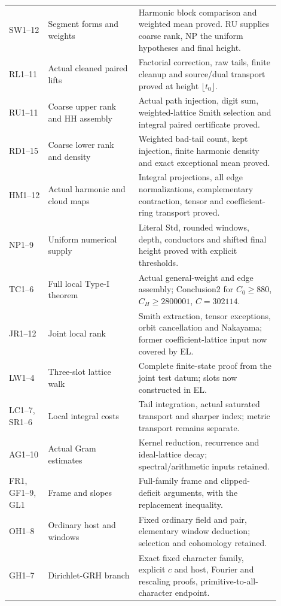 \documentclass[11pt,a4paper]{article}
\numberwithin{equation}{section}
\theoremstyle{remark}\newtheorem{remark}[theorem]{Remark}
\begin{document}
\begin{longtable}{>{\raggedright\arraybackslash}p{0.13\linewidth}>{\raggedright\arraybackslash}p{0.30\linewidth}>{\raggedright\arraybackslash}p{0.47\linewidth}}
SW1--12 & Segment forms and weights & Harmonic block comparison and weighted mean proved. RU supplies coarse rank, NP the uniform hypotheses and final height.\\[3pt]
RL1--11 & Actual cleaned paired lifts & Factorial correction, raw tails, finite cleanup and source/dual transport proved at height $\lfloor t_0\rfloor$.\\[3pt]
RU1--11 & Coarse upper rank and HH assembly & Actual path injection, digit sum, weighted-lattice Smith selection and integral paired certificate proved.\\[3pt]
RD1--15 & Coarse lower rank and density & Weighted bad-tail count, kept injection, finite harmonic density and exact exceptional mean proved.\\[3pt]
HM1--12 & Actual harmonic and cloud maps & Integral projections, all edge normalizations, complementary contraction, tensor and coefficient-ring transport proved.\\[3pt]
NP1--9 & Uniform numerical supply & Literal Std, rounded windows, depth, conductors and shifted final height proved with explicit thresholds.\\[3pt]
TC1--6 & Full local Type-I theorem & Actual general-weight and edge assembly; Conclusion2 for $C_0\ge880$, $C_H\ge2800001$, $C=302114$.\\[3pt]
JR1--12 & Joint local rank & Smith extraction, tensor exceptions, orbit cancellation and Nakayama; former coefficient-lattice input now covered by EL.\\[3pt]
LW1--4 & Three-slot lattice walk & Complete finite-state proof from the joint test datum; slots now constructed in EL.\\[3pt]
LC1--7, SR1--6 & Local integral costs & Tail integration, actual saturated transport and sharper index; metric transport remains separate.\\[3pt]
AG1--10 & Actual Gram estimates & Kernel reduction, recurrence and ideal-lattice decay; spectral/arithmetic inputs retained.\\[3pt]
FR1, GF1--9, GL1 & Frame and slopes & Full-family frame and clipped-deficit arguments, with the replacement inequality.\\[3pt]
OH1--8 & Ordinary host and windows & Fixed ordinary field and pair, elementary window deduction; selection and cohomology retained.\\[3pt]
GH1--7 & Dirichlet-GRH branch & Exact fixed character family, explicit $c$ and host, Fourier and rescaling proofs, primitive-to-all-character endpoint.\\
\bottomrule
\end{longtable}
\end{document}
